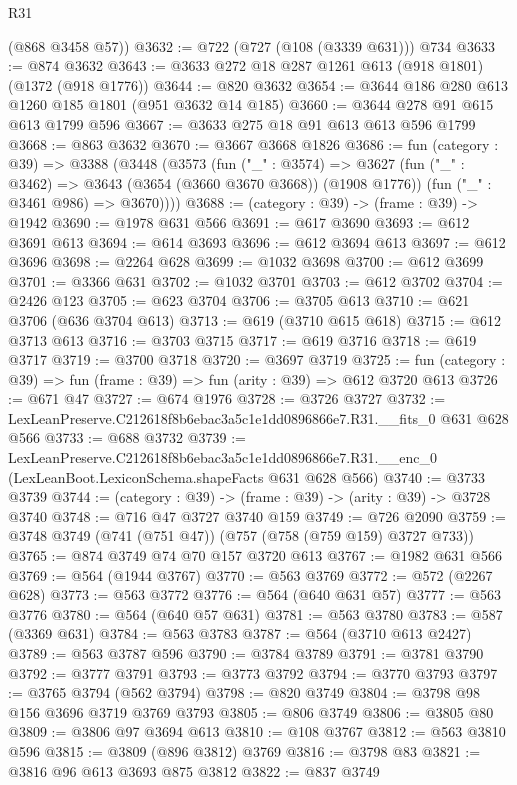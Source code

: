 \begin{lexlean}{R31}
\begin{coremodule}
      (@868 @3458 @57))
@3632 := @722 (@727 (@108 (@3339 @631))) @734
@3633 := @874 @3632
@3643 := @3633 @272 @18 @287 @1261 @613 (@918 @1801) (@1372 (@918 @1776))
@3644 := @820 @3632
@3654 := @3644 @186 @280 @613 @1260 @185 @1801 (@951 @3632 @14 @185)
@3660 := @3644 @278 @91 @615 @613 @1799 @596
@3667 := @3633 @275 @18 @91 @613 @613 @596 @1799
@3668 := @863 @3632
@3670 := @3667 @3668 @1826
@3686 := fun (category : @39) =>
  @3388
    (@3448
      (@3573
        (fun ("_" : @3574) =>
        @3627
          (fun ("_" : @3462) => @3643 (@3654 (@3660 @3670 @3668)) (@1908 @1776))
          (fun ("_" : @3461 @986) => @3670))))
@3688 := (category : @39) -> (frame : @39) -> @1942
@3690 := @1978 @631 @566
@3691 := @617 @3690
@3693 := @612 @3691 @613
@3694 := @614 @3693
@3696 := @612 @3694 @613
@3697 := @612 @3696
@3698 := @2264 @628
@3699 := @1032 @3698
@3700 := @612 @3699
@3701 := @3366 @631
@3702 := @1032 @3701
@3703 := @612 @3702
@3704 := @2426 @123
@3705 := @623 @3704
@3706 := @3705 @613
@3710 := @621 @3706 (@636 @3704 @613)
@3713 := @619 (@3710 @615 @618)
@3715 := @612 @3713 @613
@3716 := @3703 @3715
@3717 := @619 @3716
@3718 := @619 @3717
@3719 := @3700 @3718
@3720 := @3697 @3719
@3725 := fun (category : @39) => fun (frame : @39) => fun (arity : @39) => @612 @3720 @613
@3726 := @671 @47
@3727 := @674 @1976
@3728 := @3726 @3727
@3732 := LexLeanPreserve.C212618f8b6ebac3a5c1e1dd0896866e7.R31.__fits_0 @631 @628 @566
@3733 := @688 @3732
@3739 := LexLeanPreserve.C212618f8b6ebac3a5c1e1dd0896866e7.R31.__enc_0
    (LexLeanBoot.LexiconSchema.shapeFacts @631 @628 @566)
@3740 := @3733 @3739
@3744 := (category : @39) -> (frame : @39) -> (arity : @39) -> @3728 @3740
@3748 := @716 @47 @3727 @3740 @159
@3749 := @726 @2090
@3759 := @3748 @3749 (@741 (@751 @47)) (@757 (@758 (@759 @159) @3727 @733))
@3765 := @874 @3749 @74 @70 @157 @3720 @613
@3767 := @1982 @631 @566
@3769 := @564 (@1944 @3767)
@3770 := @563 @3769
@3772 := @572 (@2267 @628)
@3773 := @563 @3772
@3776 := @564 (@640 @631 @57)
@3777 := @563 @3776
@3780 := @564 (@640 @57 @631)
@3781 := @563 @3780
@3783 := @587 (@3369 @631)
@3784 := @563 @3783
@3787 := @564 (@3710 @613 @2427)
@3789 := @563 @3787 @596
@3790 := @3784 @3789
@3791 := @3781 @3790
@3792 := @3777 @3791
@3793 := @3773 @3792
@3794 := @3770 @3793
@3797 := @3765 @3794 (@562 @3794)
@3798 := @820 @3749
@3804 := @3798 @98 @156 @3696 @3719 @3769 @3793
@3805 := @806 @3749
@3806 := @3805 @80
@3809 := @3806 @97 @3694 @613
@3810 := @108 @3767
@3812 := @563 @3810 @596
@3815 := @3809 (@896 @3812) @3769
@3816 := @3798 @83
@3821 := @3816 @96 @613 @3693 @875 @3812
@3822 := @837 @3749

\end{coremodule}
\end{lexlean}

